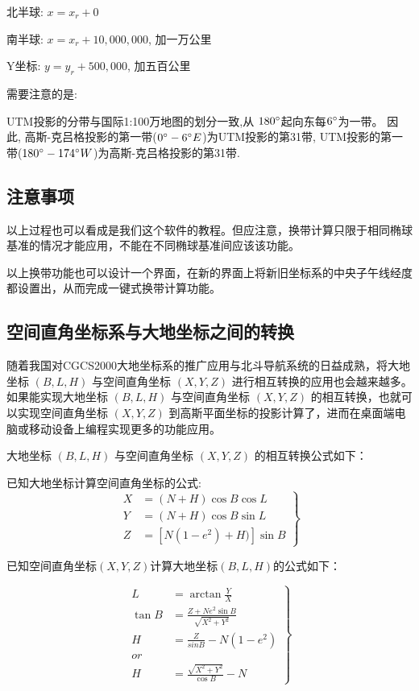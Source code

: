 北半球: $x = x_r + 0$

南半球: $x = x_r + 10,000,000$, 加一万公里

Y坐标: $y = y_r + 500,000$, 加五百公里

需要注意的是:

UTM投影的分带与国际1:100万地图的划分一致,从 $180^\circ$起向东每$6^\circ$为一带。
因此, 高斯-克吕格投影的第一带($0^\circ - 6^\circ E$)为UTM投影的第31带,
UTM投影的第一带($180^\circ - 174^\circ W$)为高斯-克吕格投影的第31带.

\subsection{注意事项}

以上过程也可以看成是我们这个软件的教程。但应注意，换带计算只限于相同椭球
基准的情况才能应用，不能在不同椭球基准间应该该功能。

以上换带功能也可以设计一个界面，在新的界面上将新旧坐标系的中央子午线经度
都设置出，从而完成一键式换带计算功能。

\subsection{空间直角坐标系与大地坐标之间的转换}

随着我国对CGCS2000大地坐标系的推广应用与北斗导航系统的日益成熟，将大地坐标 $(B, L, H)$
与空间直角坐标 $(X, Y, Z)$ 进行相互转换的应用也会越来越多。如果能实现大地坐标 $(B, L, H)$
与空间直角坐标 $(X, Y, Z)$ 的相互转换，也就可以实现空间直角坐标 $(X, Y, Z)$
到高斯平面坐标的投影计算了，进而在桌面端电脑或移动设备上编程实现更多的功能应用。

大地坐标 $(B, L, H)$ 与空间直角坐标 $(X, Y, Z)$ 的相互转换公式如下：

已知大地坐标计算空间直角坐标的公式:
\begin{equation}
    \left .
    \begin{aligned}
        X & = (N+H) \cos B \cos L      \\
        Y & = (N+H) \cos B \sin L      \\
        Z & = [N(1 - e^2) + H)] \sin B
    \end{aligned}
    \right \}
\end{equation}

已知空间直角坐标$(X,Y,Z)$计算大地坐标$(B, L, H)$的公式如下：

\begin{equation}
    \left .
    \begin{aligned}
        L      & = \arctan \frac{Y}{X}                      \\
        \tan B & = \frac{Z + Ne^2 \sin B}{\sqrt{X^2 + Y^2}} \\
        H      & = \frac{Z}{sinB} - N(1-e^2)                \\
        or                                                  \\
        H      & =\frac{\sqrt{X^2 + Y^2}}{\cos B} - N
    \end{aligned}
    \right \}
\end{equation}

